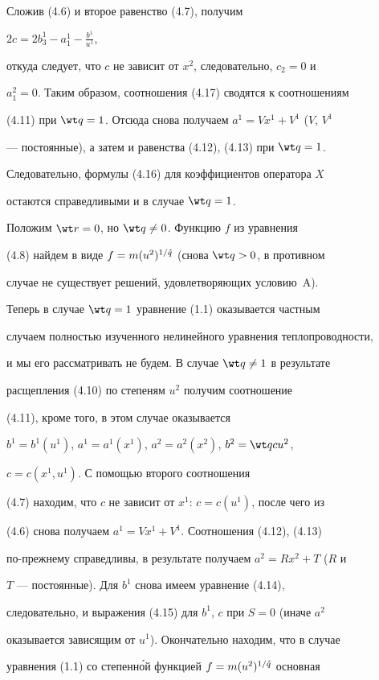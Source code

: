 Сложив (4.6) и второе равенство (4.7), получим 


$2c=2b^1_3-a^1_1-\frac{b^1}{u^1}$, 


откуда следует, что $c$ не зависит от $x^2$, следовательно, $c_2=0$ и 


$a^2_1=0$. Таким образом, соотношения (4.17) сводятся к соотношениям 


(4.11) при $\wt q=1$. Отсюда снова получаем $a^1=Vx^1+V^1$ ($V$, $V^1$ 


--- постоянные), а затем и равенства (4.12), (4.13) при $\wt q=1$. 


Следовательно, формулы (4.16) для коэффициентов оператора $X$ 


остаются справедливыми и в случае $\wt q=1$. 


 


Положим $\wt r=0$, но $\wt q\ne0$. Функцию $f$ из уравнения 


(4.8) найдем в виде $f=m(u^2)^{1/\Tilde q}$ (снова $\wt q>0$, в противном 


случае не существует решений, удовлетворяющих условию~A). 


Теперь в случае $\wt q=1$ уравнение (1.1) оказывается частным 


случаем полностью изученного нелинейного уравнения теплопроводности, 


и мы его рассматривать не будем. В случае $\wt q\ne1$ в результате 


расщепления (4.10) по степеням $u^2$ получим соотношение 


(4.11), кроме того, в этом случае оказывается 


$b^1=b^1(u^1)$, $a^1=a^1(x^1)$, $a^2=a^2(x^2)$, $b^2=\wt q cu^2$, 


$c=c(x^1,u^1)$. С помощью второго соотношения 


(4.7) находим, что $c$ не зависит от $x^1$: $c=c(u^1)$, после чего из 


(4.6) снова получаем $a^1=Vx^1+V^1$. Соотношения (4.12), (4.13) 


по-прежнему справедливы, в результате получаем $a^2=Rx^2+T$ ($R$ и 


$T$ --- постоянные). Для $b^1$ снова имеем уравнение (4.14), 


следовательно, и выражения (4.15) для $b^1$, $c$ при $S=0$ (иначе $a^2$ 


оказывается зависящим от $u^1$). Окончательно находим, что в случае 


уравнения (1.1) со степенн\'ой функцией $f=m(u^2)^{1/\Tilde q}$ основная 


